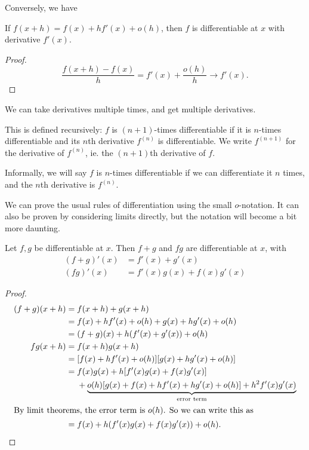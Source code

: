 \documentclass[a4paper]{article}
\begin{document}
Conversely, we have
\begin{prop}
  If $f(x + h) = f(x) + hf'(x) + o(h)$, then $f$ is differentiable at $x$ with derivative $f'(x)$.
\end{prop}
\begin{proof}
  \[
    \frac{f(x + h) - f(x)}{h} = f'(x) + \frac{o(h)}{h} \to f'(x).
  \]
\end{proof}

We can take derivatives multiple times, and get multiple derivatives.
\begin{defi}
  This is defined recursively: $f$ is $(n + 1)$-times differentiable if it is $n$-times differentiable and its $n$th derivative $f^{(n)}$ is differentiable. We write $f^{(n + 1)}$ for the derivative of $f^{(n)}$, ie. the $(n + 1)$th derivative of $f$.

  Informally, we will say $f$ is $n$-times differentiable if we can differentiate it $n$ times, and the $n$th derivative is $f^{(n)}$.
\end{defi}

We can prove the usual rules of differentiation using the small $o$-notation. It can also be proven by considering limits directly, but the notation will become a bit more daunting.
\begin{lemma}
  Let $f, g$ be differentiable at $x$. Then $f + g$ and $fg$ are differentiable at $x$, with
  \begin{align*}
    (f + g)'(x) &= f'(x) + g'(x)\\
    (fg)'(x) &= f'(x)g(x) + f(x)g'(x)
  \end{align*}
\end{lemma}

\begin{proof}
  \begin{align*}
    (f + g)(x + h) ={}& f(x + h) + g(x + h)\\
    ={}& f(x) +hf'(x) + o(h) + g(x) + hg'(x) + o(h)\\
    ={}& (f + g)(x) + h(f'(x) + g'(x)) + o(h)\\
    fg(x + h) ={}& f(x + h)g(x + h)\\
    ={}& [f(x) + hf'(x) + o(h)][g(x) + hg'(x) + o(h)]\\
    ={}& f(x)g(x) + h[f'(x)g(x) + f(x)g'(x)]\\
    &+ \underbrace{o(h)[g(x) + f(x) + hf'(x) + hg'(x) + o(h)] + h^2f'(x)g'(x)}_{\text{error term}}\\
    \intertext{By limit theorems, the error term is $o(h)$. So we can write this as}
    ={}& f(x) + h(f'(x)g(x) + f(x)g'(x)) + o(h).
  \end{align*}
\end{proof}
\end{document}

